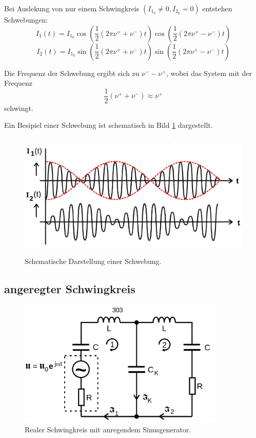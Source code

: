 Bei Auslekung von nur einem Schwingkreis $(I_{1_0}\neq 0,I_{2_0}=0)$ entstehen Schwebungen:
\begin{equation}
    I_1(t)=I_{1_0}\cos(\frac{1}{2}\left(2\pi\nu^++\nu^-\right)t)\cos(\frac{1}{2}\left(2\pi\nu^+-\nu^-\right)t)
\end{equation}
\begin{equation}
    I_2(t)=I_{1_0}\sin(\frac{1}{2}\left(2\pi\nu^++\nu^-\right)t)\sin(\frac{1}{2}\left(2\pi\nu^+-\nu^-\right)t)
\end{equation}

Die Frequenz der Schwebung ergibt sich zu $\nu^--\nu^+$, wobei das System mit der Frequenz
\begin{equation}
    \frac{1}{2}(\nu^++\nu^-)\approx \nu^+
\end{equation}
schwingt.

Ein Besipiel einer Schwebung ist schematisch in Bild \ref{fig:Bild3} dargestellt.
\begin{figure}
\label{fig:Bild3}
    \centering
    \includegraphics[height=6.0cm]{data/Bild3.png}
    \caption{Schematische Darstellung einer Schwebung.}
\end{figure}

\subsection{angeregter Schwingkreis}

\begin{figure}
\label{fig:Bild4}
    \centering
    \includegraphics[height=6.0cm]{data/Bild4.png}
    \caption{Realer Schwingkreis mit anregendem Sinusgenerator.}
\end{figure}

